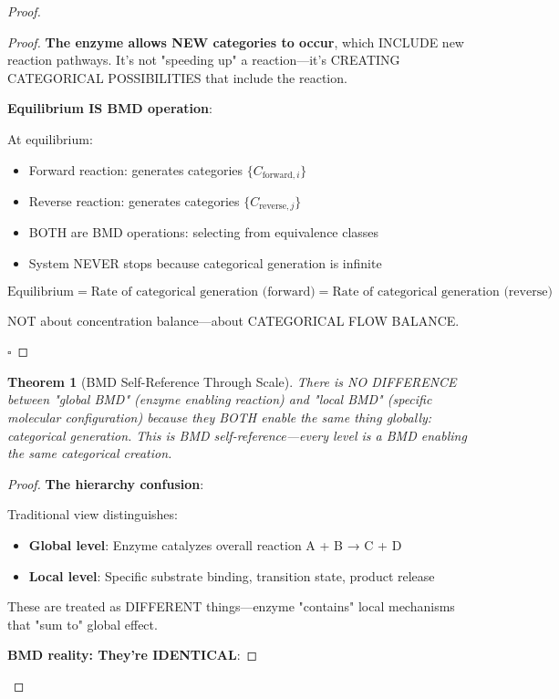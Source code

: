 \documentclass[11pt,a4paper]{article}
\newtheorem{theorem}{Theorem}
\begin{document}
\begin{proof}
\begin{proof}
\textbf{The enzyme allows NEW categories to occur}, which INCLUDE new reaction pathways. It's not "speeding up" a reaction—it's CREATING CATEGORICAL POSSIBILITIES that include the reaction.

\textbf{Equilibrium IS BMD operation}:

At equilibrium:
\begin{itemize}
\item Forward reaction: generates categories $\{C_{\text{forward},i}\}$
\item Reverse reaction: generates categories $\{C_{\text{reverse},j}\}$
\item BOTH are BMD operations: selecting from equivalence classes
\item System NEVER stops because categorical generation is infinite
\end{itemize}

\begin{equation}
\text{Equilibrium} = \text{Rate of categorical generation (forward)} = \text{Rate of categorical generation (reverse)}
\end{equation}

NOT about concentration balance—about CATEGORICAL FLOW BALANCE.

$\square$
\end{proof}

\begin{theorem}[BMD Self-Reference Through Scale]
\label{thm:bmd_scale_identity}
There is NO DIFFERENCE between "global BMD" (enzyme enabling reaction) and "local BMD" (specific molecular configuration) because they BOTH enable the same thing globally: categorical generation. This is BMD self-reference—every level is a BMD enabling the same categorical creation.
\end{theorem}

\begin{proof}
\textbf{The hierarchy confusion}:

Traditional view distinguishes:
\begin{itemize}
\item \textbf{Global level}: Enzyme catalyzes overall reaction A + B → C + D
\item \textbf{Local level}: Specific substrate binding, transition state, product release
\end{itemize}

These are treated as DIFFERENT things—enzyme "contains" local mechanisms that "sum to" global effect.

\textbf{BMD reality: They're IDENTICAL}:


\end{proof}
\end{proof}
\end{document}
